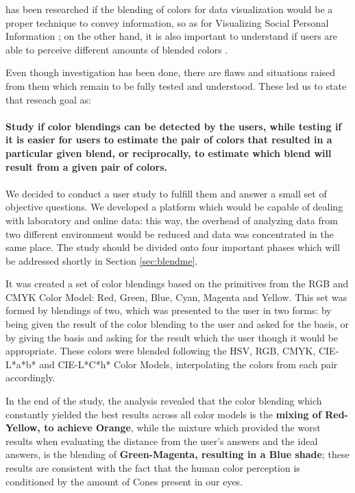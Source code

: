 has been researched if the blending of colors for data visualization \cite{Gama20141} would be a proper technique
to convey information, so as for Visualizing Social Personal Information \cite{Gama20143}; on the other hand, it
is also important to understand if users are able to perceive different amounts of blended colors \cite{Gama20142}. \par
%
Even though investigation has been done, there are flaws and situations raised from them which remain to be fully
tested and understood. These led us to state that reseach goal as: \\ \\
%
\textbf{Study if color blendings can be detected by the users, while testing if it is easier for
users to estimate the pair of colors that resulted in a particular given blend, or reciprocally, to estimate
which blend will result from a given pair of colors.} \\ \\
%
We decided to conduct a user study to fulfill them and answer a small set of objective
questions. We developed a platform which would be capable of dealing with laboratory and online data: this way,
the overhead of analyzing data from two different environment would be reduced and data was concentrated in the same
place. The study should be divided onto four important phases which will be addressed shortly in Section \ref{sec:blendme}. \par
%
It was created a set of color blendings based on the primitives from the RGB and CMYK Color Model: Red, Green, Blue,
Cyan, Magenta and Yellow. This set was formed by blendings of two, which was presented to the user in two forms:
by being given the result of the color blending to the user and asked for the basis, or by giving the basis and asking
for the result which the user though it would be appropriate. These colors were blended following the HSV, RGB, CMYK,
CIE-L*a*b* and CIE-L*C*h* Color Models, interpolating the colors from each pair accordingly. \par
%
In the end of the study, the analysis revealed that the color blending which
constantly yielded the best results across all color models is the \textbf{mixing of Red-Yellow, to achieve Orange}, while
the mixture which provided the worst results when evaluating the distance from the user’s answers and the ideal answers,
is the blending of \textbf{Green-Magenta, resulting in a Blue shade}; these results are consistent with the fact that
the human color perception is conditioned by the amount of Cones present in our eyes. \par
